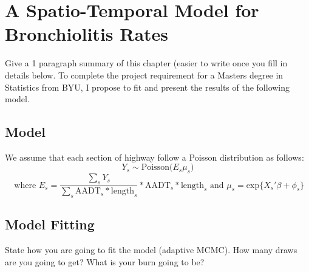 \chapter{A Spatio-Temporal Model for Bronchiolitis Rates}
Give a 1 paragraph summary of this chapter (easier to write once you fill in details below.
 To complete the project requirement for a Masters degree in Statistics from BYU, I propose to fit and present the results of the following model.

\section{Model}
We assume that each section of highway follow a Poisson distribution as follows:
$$  Y_s \sim \textrm{Poisson}\big( E_s \mu_s\big) $$
$$ \textrm{ where } E_s = \frac{\sum_s Y_s}{\sum_s \textrm{AADT}_s * \textrm{length}_s} * \textrm{AADT}_s * \textrm{length}_s \textrm{ and } \mu_s = \textrm{exp}\{ X_s'\beta + \phi_s \}$$


\section{Model Fitting}
State how you are going to fit the model (adaptive MCMC).  How many draws are you going to get?  What is your burn going to be?



